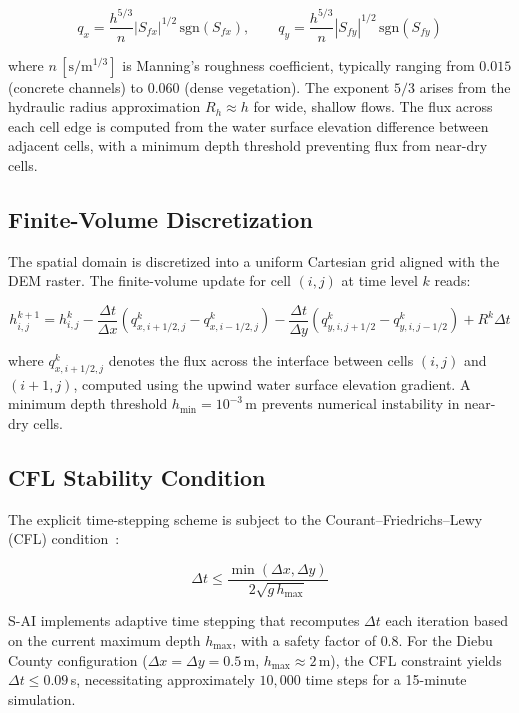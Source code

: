 \documentclass[11pt, a4paper]{article}
\begin{document}
\begin{equation}
  q_x = \frac{h^{5/3}}{n}\left|S_{fx}\right|^{1/2}\,\mathrm{sgn}(S_{fx}), \qquad q_y = \frac{h^{5/3}}{n}\left|S_{fy}\right|^{1/2}\,\mathrm{sgn}(S_{fy})
  \label{eq:manning}
\end{equation}

\noindent where $n\,[\mathrm{s/m^{1/3}}]$ is Manning's roughness coefficient, typically ranging from $0.015$ (concrete channels) to $0.060$ (dense vegetation). The exponent $5/3$ arises from the hydraulic radius approximation $R_h \approx h$ for wide, shallow flows. The flux across each cell edge is computed from the water surface elevation difference between adjacent cells, with a minimum depth threshold preventing flux from near-dry cells.

\subsection{Finite-Volume Discretization}

The spatial domain is discretized into a uniform Cartesian grid aligned with the DEM raster. The finite-volume update for cell $(i,j)$ at time level $k$ reads:

\begin{equation}
  h_{i,j}^{k+1} = h_{i,j}^k - \frac{\Delta t}{\Delta x}\!\left(q_{x,i+1/2,j}^k - q_{x,i-1/2,j}^k\right) - \frac{\Delta t}{\Delta y}\!\left(q_{y,i,j+1/2}^k - q_{y,i,j-1/2}^k\right) + R^k \Delta t
  \label{eq:fvm}
\end{equation}

\noindent where $q_{x,i+1/2,j}^k$ denotes the flux across the interface between cells $(i,j)$ and $(i+1,j)$, computed using the upwind water surface elevation gradient. A minimum depth threshold $h_{\min} = 10^{-3}\,\mathrm{m}$ prevents numerical instability in near-dry cells.

\subsection{CFL Stability Condition}

The explicit time-stepping scheme is subject to the Courant--Friedrichs--Lewy (CFL) condition~\cite{cfl}:

\begin{equation}
  \Delta t \leq \frac{\min(\Delta x, \Delta y)}{2\sqrt{g\,h_{\max}}}
  \label{eq:cfl}
\end{equation}

\noindent S-AI implements adaptive time stepping that recomputes $\Delta t$ each iteration based on the current maximum depth $h_{\max}$, with a safety factor of $0.8$. For the Diebu County configuration ($\Delta x = \Delta y = 0.5$\,m, $h_{\max} \approx 2$\,m), the CFL constraint yields $\Delta t \leq 0.09$\,s, necessitating approximately $10{,}000$ time steps for a 15-minute simulation.
\end{document}
